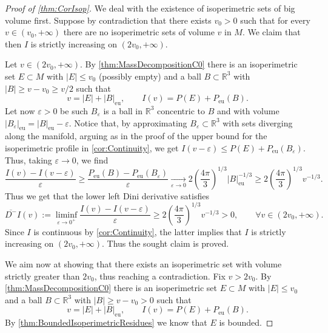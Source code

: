 \documentclass[10pt,a4paper]{amsart}
\newcommand{\eps}{\varepsilon}
\begin{document}
\begin{proof}[Proof of \cref{thm:CorIsop}]
We deal with the existence of isoperimetric sets of big volume first.
Suppose by contradiction that there exists $v_0 >0$ such that for every $v\in (v_0,+\infty)$ there are no isoperimetric sets of volume $v$ in $M$. We claim that then $I$ is strictly increasing on $(2v_0,+\infty)$.

Let $v\in (2v_0,+\infty)$. By \cref{thm:MassDecompositionC0} there is an isoperimetric set $E\subset M$ with $|E|\leq v_0$ (possibly empty) and a ball $B\subset \mathbb R^3$ with $|B|\geq v-v_0 \geq v/2$ such that 
\[
v=|E|+|B|_{\mathrm{eu}},\qquad I(v)=P(E)+P_{\mathrm{eu}}(B).
\]
Let now $\varepsilon>0$ be such $B_\varepsilon$ is a ball in $\mathbb{R}^3$ concentric to $B$ and with volume $|B_\varepsilon|_{\mathrm{eu}}=|B|_{\mathrm{eu}}-\varepsilon$. Notice that, by approximating $B_\varepsilon\subset \mathbb R^3$ with sets diverging along the manifold, arguing as in the proof of the upper bound for the isoperimetric profile in \cref{cor:Continuity}, we get $I(v-\varepsilon)\leq P(E)+P_{\mathrm{eu}}(B_\varepsilon)$. Thus, taking $\varepsilon\to0$, we find
\[
\frac{I(v)-I(v-\varepsilon)}{\varepsilon} \geq \frac{P_{\mathrm{eu}}(B)-P_{\mathrm{eu}}(B_\varepsilon)}{\varepsilon}
\xrightarrow[\eps\to 0]{}
 2 \left(\frac{4\pi}{3}\right)^{1/3}|B|_{\mathrm{eu}}^{-1/3}
 \geq 2 \left(\frac{4\pi}{3}\right)^{1/3}v^{-1/3}.
\]
    Thus we get that the lower left Dini derivative satisfies
    \[
    \overline{D^-} I(v):=\liminf_{\varepsilon\to 0^+} \frac{I(v)-I(v-\varepsilon)}{\varepsilon} \geq 2 \left(\frac{4\pi}{3}\right)^{1/3}v^{-1/3} 
    >0, \qquad \forall v\in (2v_0,+\infty).
    \]
    Since $I$ is continuous by \cref{cor:Continuity},  the latter implies that $I$ is strictly increasing on $(2v_0,+\infty)$. Thus the sought claim is proved.

    We aim now at showing that there exists an isoperimetric set with volume strictly greater than $2v_0$, thus reaching a contradiction. Fix $v>2v_0$. By \cref{thm:MassDecompositionC0} there is an isoperimetric set $E\subset M$ with $|E|\leq v_0$ and a ball $B\subset \mathbb R^3$ with $|B|\geq v-v_0>0$ such that 
\[
v=|E|+|B|_{\mathrm{eu}},\qquad I(v)=P(E)+P_{\mathrm{eu}}(B).
\]
By \cref{thm:BoundedIsoperimetricResidues} we know that $E$ is bounded. 


\end{proof}
\end{document}
